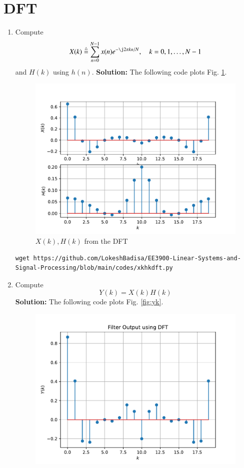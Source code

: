 \documentclass[journal,12pt,twocolumn]{IEEEtran}
\newcommand{\solution}{\noindent \textbf{Solution: }}
\numberwithin{equation}{section}
\renewcommand\thesection{\arabic{section}}
\newcommand{\define}{\stackrel{\triangle}{=}}
\begin{document}
\section{DFT}
\begin{enumerate}[label=\thesection.\arabic*]
\item
Compute
\begin{equation}
X(k) \define \sum _{n=0}^{N-1}x(n) e^{-\j2\pi kn/N}, \quad k = 0,1,\dots, N-1
\end{equation}
and $H(k)$ using $h(n)$.
\solution The following code plots Fig. \ref{fig:xkhk}. 
\begin{figure}[!ht]
\centering
\includegraphics[width=\columnwidth]{./figs/xkhk}
\caption{$X(k) ,H(k)$ from the DFT}
\label{fig:xkhk}
\end{figure}
\begin{lstlisting}
wget https://github.com/LokeshBadisa/EE3900-Linear-Systems-and-Signal-Processing/blob/main/codes/xkhkdft.py
\end{lstlisting}
\item Compute 
\begin{equation}
Y(k) = X(k)H(k)
\end{equation}
\solution The following code plots Fig. \ref{fig:yk}. 
\begin{figure}[!ht]
\centering
\includegraphics[width=\columnwidth]{./figs/yk}

\end{figure}
\end{enumerate}
\end{document}
